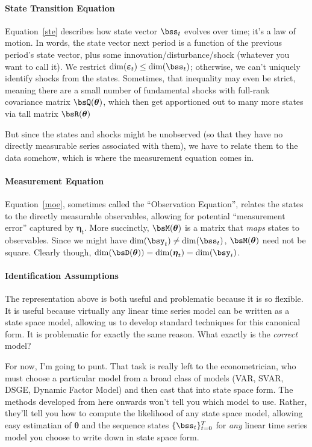 \documentclass[12pt]{article}
\theoremstyle{plain}
\theoremstyle{definition}
\theoremstyle{remark}
\newcommand{\bseta}{\boldsymbol{\eta}}
\newcommand{\bstheta}{\boldsymbol{\theta}}
\newcommand{\bsvarepsilon}{\boldsymbol{\varepsilon}}
\begin{document}
\paragraph{State Transition Equation} Equation~\ref{ste} describes how
state vector $\bss_t$ evolves over time; it's a law of motion. In
words, the state vector next period is a function of the previous
period's state vector, plus some innovation/disturbance/shock (whatever
you want to call it).
We restrict $\dim(\bsvarepsilon_t)\leq \dim(\bss_t)$; otherwise, we
can't uniquely identify shocks from the states. Sometimes, that
inequality may even be strict, meaning there are a small number of
fundamental shocks with full-rank covariance matrix $\bsQ(\bstheta)$,
which then get apportioned out to many more states via tall matrix
$\bsR(\bstheta)$

But since the states and shocks might be unobserved (so that they have
no directly measurable series associated with them), we have to relate
them to the data somehow, which is where the measurement equation comes
in.

\paragraph{Measurement Equation} Equation~\ref{moe}, sometimes called
the ``Observation Equation'', relates the states to the directly
measurable observables, allowing for potential ``measurement error''
captured by $\bseta_t$. More succinctly, $\bsM(\bstheta)$ is a matrix
that \emph{maps} states to observables. Since we might have
$\dim(\bsy_t)\neq\dim(\bss_t)$, $\bsM(\bstheta)$ need not be square.
Clearly though, $\dim(\bsD(\bstheta))=\dim(\bseta_t)=\dim(\bsy_t)$.


\paragraph{Identification Assumptions}
The representation above is both useful and problematic because it is so
flexible. It is useful because virtually any linear time series model
can be written as a state space model, allowing us to develop standard
techniques for this canonical form. It is problematic for exactly the
same reason.  What exactly is the \emph{correct} model?

For now, I'm going to punt. That task is really left to the
econometrician, who must choose a particular model from a
broad class of models (VAR, SVAR, DSGE, Dynamic Factor Model) and then
cast that into state space form. The methods developed from here
onwards won't tell you which model to use. Rather, they'll tell you how
to compute the likelihood of any state space model, allowing easy
estimatian of $\bstheta$ and the sequence states $\{\bss_t\}_{t=0}^T$
for \emph{any} linear time series model you choose to write down in
state space form.
\end{document}

